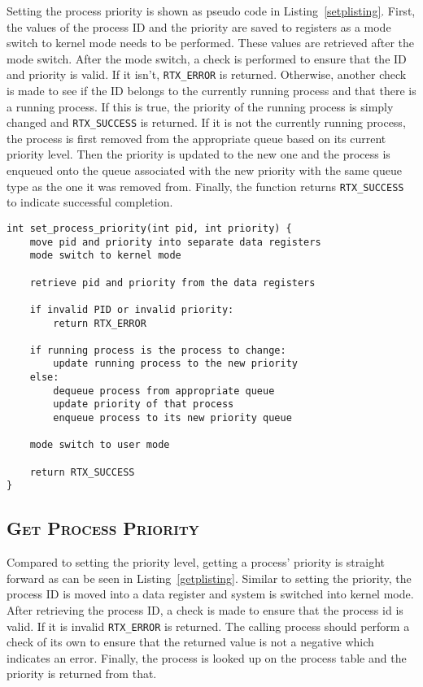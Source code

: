 \documentclass[oneside]{report}
\begin{document}
Setting the process priority is shown as pseudo code in
Listing~\ref{setplisting}. First, the values of the process ID and the priority
are saved to registers as a mode switch to kernel mode needs to be performed.
These values are retrieved after the mode switch. After the mode switch, a
check is performed to ensure that the ID and priority is valid. If it isn't,
\texttt{RTX\_ERROR} is returned. Otherwise, another check is made to see if the
ID belongs to the currently running process and that there is a running
process. If this is true, the priority of the running process is simply changed 
and \texttt{RTX\_SUCCESS} is returned. If it is not the currently running 
process, the process is first removed from the appropriate queue based on its 
current priority level. Then the priority is updated to the new one and the 
process is enqueued onto the queue associated with the new priority with the 
same queue type as the one it was removed from. Finally, the function returns 
\texttt{RTX\_SUCCESS} to indicate successful completion.

\begin{lstlisting}
int set_process_priority(int pid, int priority) {
    move pid and priority into separate data registers
    mode switch to kernel mode
    
    retrieve pid and priority from the data registers

    if invalid PID or invalid priority:
        return RTX_ERROR
    
    if running process is the process to change:
        update running process to the new priority
    else:
        dequeue process from appropriate queue
        update priority of that process
        enqueue process to its new priority queue

    mode switch to user mode

    return RTX_SUCCESS
}
\end{lstlisting}

\subsection{\textsc{Get Process Priority}}
Compared to setting the priority level, getting a process' priority is straight
forward as can be seen in Listing~\ref{getplisting}. Similar to setting the
priority, the process ID is moved into a data register and system is switched 
into kernel mode. After retrieving the process ID, a check is made to ensure
that the process id is valid. If it is invalid \texttt{RTX\_ERROR} is returned.
The calling process should perform a check of its own to ensure that
the returned value is not a negative which indicates an error. Finally, the
process is looked up on the process table and the priority is returned from
that.
\end{document}
